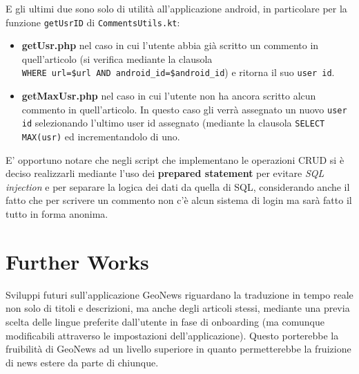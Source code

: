 \documentclass[12pt]{article}
\def\code#1{\texttt{#1}}
\begin{document}
E gli ultimi due sono solo di utilità all'applicazione android, in particolare per la funzione \code{getUsrID} di \code{CommentsUtils.kt}:
\begin{itemize}
\item\textbf{getUsr.php} nel caso in cui l'utente abbia già scritto un commento in quell'articolo (si verifica mediante la clausola\\ \code{WHERE url=\$url AND android\_id=\$android\_id}) e ritorna il suo \code{user id}.

\item\textbf{getMaxUsr.php}  nel caso in cui l'utente non ha ancora scritto alcun commento in quell'articolo. In questo caso gli verrà assegnato un nuovo \code{user id} selezionando l'ultimo user id assegnato (mediante la clausola \code{SELECT MAX(usr)} ed incrementandolo di uno.
\end{itemize}
E' opportuno notare che negli script che implementano le operazioni CRUD si è deciso realizzarli mediante l'uso dei \textbf{prepared statement} per evitare \textit{SQL injection} e per separare la logica dei dati da quella di SQL, considerando anche il fatto che per scrivere un commento non c'è alcun sistema di login ma sarà fatto il tutto in forma anonima.

\section{Further Works}
Sviluppi futuri sull'applicazione GeoNews riguardano la traduzione in tempo reale non solo di titoli e descrizioni, ma anche degli articoli stessi, mediante una previa scelta delle lingue preferite dall'utente in fase di onboarding (ma comunque modificabili attraverso le impostazioni dell'applicazione). Questo porterebbe la fruibilità di GeoNews ad un livello superiore in quanto permetterebbe la fruizione di news estere da parte di chiunque.
\end{document}
